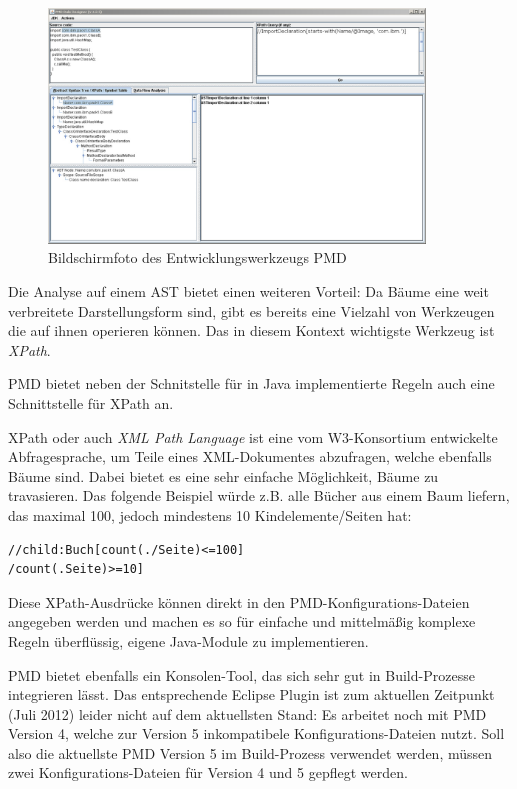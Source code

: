 \begin{figure}[htbp]
\includegraphics[width=10cm]{pmd-dev}
\caption{Bildschirmfoto des Entwicklungswerkzeugs PMD}
\end{figure}

Die Analyse auf einem AST bietet einen weiteren Vorteil: Da Bäume eine weit verbreitete Darstellungsform sind, gibt es bereits eine Vielzahl von Werkzeugen die auf ihnen operieren können. Das in diesem Kontext wichtigste Werkzeug ist \textit{XPath}.

PMD bietet neben der Schnitstelle für in Java implementierte Regeln auch eine Schnittstelle für XPath an.

XPath oder auch \textit{XML Path Language} ist eine vom W3-Konsortium entwickelte Abfragesprache, um Teile eines XML-Dokumentes abzufragen, welche ebenfalls Bäume sind. Dabei bietet es eine sehr einfache Möglichkeit, Bäume zu travasieren. Das folgende Beispiel würde z.B. alle Bücher aus einem Baum liefern, das maximal 100, jedoch mindestens 10 Kindelemente/Seiten hat:


\begin{lstlisting}
//child:Buch[count(./Seite)<=100]
/count(.Seite)>=10]
\end{lstlisting}

Diese XPath-Ausdrücke können direkt in den PMD-Konfigurations-Dateien angegeben werden und machen es so für einfache und mittelmäßig komplexe Regeln überflüssig, eigene Java-Module zu implementieren.

PMD bietet ebenfalls ein Konsolen-Tool, das sich sehr gut in Build-Prozesse integrieren lässt. Das entsprechende Eclipse Plugin ist zum aktuellen Zeitpunkt (Juli 2012) leider nicht auf dem aktuellsten Stand: Es arbeitet noch mit PMD Version 4, welche zur Version 5 inkompatibele Konfigurations-Dateien nutzt. Soll also die aktuellste PMD Version 5 im Build-Prozess verwendet werden, müssen zwei Konfigurations-Dateien für Version 4 und 5 gepflegt werden.


